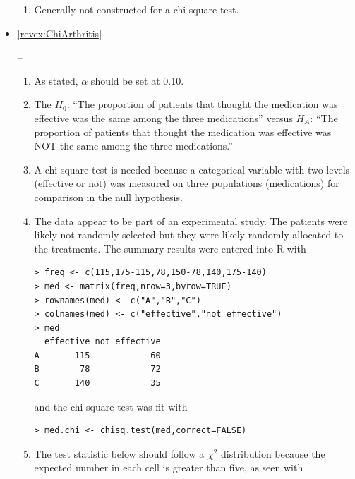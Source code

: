 \documentclass[10pt,openany]{book}\usepackage[]{graphicx}\usepackage[]{color}
\makeatletter
\newenvironment{kframe}{%
 \def\at@end@of@kframe{}%
 \ifinner\ifhmode%
  \def\at@end@of@kframe{\end{minipage}}%
  \begin{minipage}{\columnwidth}%
 \fi\fi%
 \def\FrameCommand##1{\hskip\@totalleftmargin \hskip-\fboxsep
 \colorbox{shadecolor}{##1}\hskip-\fboxsep
     \hskip-\linewidth \hskip-\@totalleftmargin \hskip\columnwidth}%
 \MakeFramed {\advance\hsize-\width
   \@totalleftmargin\z@ \linewidth\hsize
   \@setminipage}}%
 {\par\unskip\endMakeFramed%
 \at@end@of@kframe}
\newenvironment{knitrout}{}{} %
\makeatother
\begin{document}
\begin{itemize}
\begin{enumerate}
      \item Generally not constructed for a chi-square test.
    \end{enumerate}
  \item \hypertarget{ans:ChiArthritis}{\ref{revex:ChiArthritis}} --
    \begin{enumerate}
      \item As stated, $\alpha$ should be set at 0.10.
      \item The $H_{0}$: ``The proportion of patients that thought the medication was effective was the same among the three medications'' versus $H_{A}$: ``The proportion of patients that thought the medication was effective was NOT the same among the three medications.''
      \item A chi-square test is needed because a categorical variable with two levels (effective or not) was measured on three populations (medications) for comparison in the null hypothesis.
      \item The data appear to be part of an experimental study.  The patients were likely not randomly selected but they were likely randomly allocated to the treatments.  The summary results were entered into R with
\begin{knitrout}
\color{fgcolor}\begin{kframe}
\begin{verbatim}
> freq <- c(115,175-115,78,150-78,140,175-140)
> med <- matrix(freq,nrow=3,byrow=TRUE)
> rownames(med) <- c("A","B","C")
> colnames(med) <- c("effective","not effective")
> med
  effective not effective
A       115            60
B        78            72
C       140            35
\end{verbatim}
\end{kframe}
\end{knitrout}
and the chi-square test was fit with
\begin{knitrout}
\color{fgcolor}\begin{kframe}
\begin{verbatim}
> med.chi <- chisq.test(med,correct=FALSE)
\end{verbatim}
\end{kframe}
\end{knitrout}
      \item The test statistic below should follow a $\chi^{2}$ distribution because the expected number in each cell is greater than five, as seen with
\begin{knitrout}

\end{knitrout}
\end{enumerate}
\end{itemize}
\end{document}
